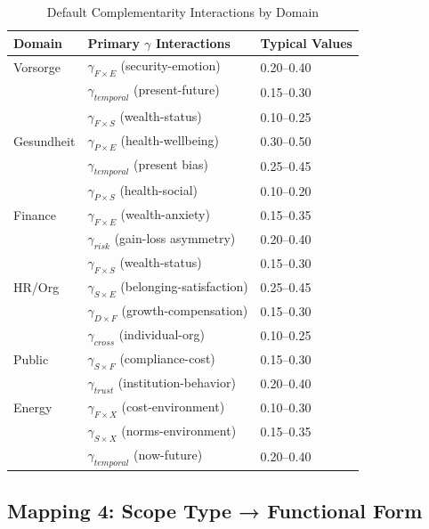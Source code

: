 \begin{table}[htbp]
\centering
\caption{Default Complementarity Interactions by Domain}
\label{tab:ggg-gamma-mapping}
\renewcommand{\arraystretch}{1.3}
\begin{tabular}{@{}lp{5cm}l@{}}
\toprule
\textbf{Domain} & \textbf{Primary $\gamma$ Interactions} & \textbf{Typical Values} \\
\midrule
Vorsorge & $\gamma_{F \times E}$ (security-emotion) & 0.20--0.40 \\
& $\gamma_{temporal}$ (present-future) & 0.15--0.30 \\
& $\gamma_{F \times S}$ (wealth-status) & 0.10--0.25 \\
\addlinespace
Gesundheit & $\gamma_{P \times E}$ (health-wellbeing) & 0.30--0.50 \\
& $\gamma_{temporal}$ (present bias) & 0.25--0.45 \\
& $\gamma_{P \times S}$ (health-social) & 0.10--0.20 \\
\addlinespace
Finance & $\gamma_{F \times E}$ (wealth-anxiety) & 0.15--0.35 \\
& $\gamma_{risk}$ (gain-loss asymmetry) & 0.20--0.40 \\
& $\gamma_{F \times S}$ (wealth-status) & 0.15--0.30 \\
\addlinespace
HR/Org & $\gamma_{S \times E}$ (belonging-satisfaction) & 0.25--0.45 \\
& $\gamma_{D \times F}$ (growth-compensation) & 0.15--0.30 \\
& $\gamma_{cross}$ (individual-org) & 0.10--0.25 \\
\addlinespace
Public & $\gamma_{S \times F}$ (compliance-cost) & 0.15--0.30 \\
& $\gamma_{trust}$ (institution-behavior) & 0.20--0.40 \\
\addlinespace
Energy & $\gamma_{F \times X}$ (cost-environment) & 0.10--0.30 \\
& $\gamma_{S \times X}$ (norms-environment) & 0.15--0.35 \\
& $\gamma_{temporal}$ (now-future) & 0.20--0.40 \\
\bottomrule
\end{tabular}
\end{table}

\subsection{Mapping 4: Scope Type → Functional Form}

